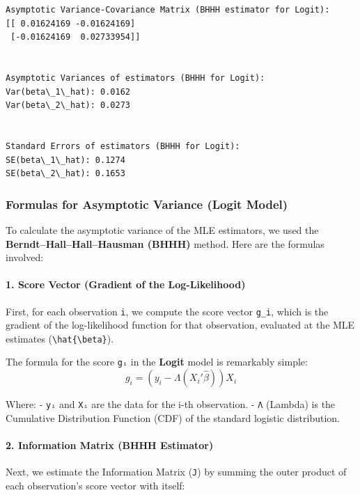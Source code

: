 \documentclass[11pt]{article}
\begin{document}
    \begin{Verbatim}[commandchars=\\\{\}]
Asymptotic Variance-Covariance Matrix (BHHH estimator for Logit):
[[ 0.01624169 -0.01624169]
 [-0.01624169  0.02733954]]


Asymptotic Variances of estimators (BHHH for Logit):
Var(beta\_1\_hat): 0.0162
Var(beta\_2\_hat): 0.0273


Standard Errors of estimators (BHHH for Logit):
SE(beta\_1\_hat): 0.1274
SE(beta\_2\_hat): 0.1653
    \end{Verbatim}

    \subsubsection{Formulas for Asymptotic Variance (Logit
Model)}\label{formulas-for-asymptotic-variance-logit-model}

To calculate the asymptotic variance of the MLE estimators, we used the
\textbf{Berndt--Hall--Hall--Hausman (BHHH)} method. Here are the
formulas involved:

\paragraph{1. Score Vector (Gradient of the
Log-Likelihood)}\label{score-vector-gradient-of-the-log-likelihood}

First, for each observation \texttt{i}, we compute the score vector
\texttt{g\_i}, which is the gradient of the log-likelihood function for
that observation, evaluated at the MLE estimates
(\texttt{\textbackslash{}hat\{\textbackslash{}beta\}}).

The formula for the score \texttt{gᵢ} in the \textbf{Logit} model is
remarkably simple: \[ g_i = (y_i - \Lambda(X_i'\hat{\beta})) X_i \]

Where: - \texttt{yᵢ} and \texttt{Xᵢ} are the data for the i-th
observation. - \texttt{Λ} (Lambda) is the Cumulative Distribution
Function (CDF) of the standard logistic distribution.

\paragraph{2. Information Matrix (BHHH
Estimator)}\label{information-matrix-bhhh-estimator}

Next, we estimate the Information Matrix (\texttt{J}) by summing the
outer product of each observation's score vector with itself:
\end{document}

